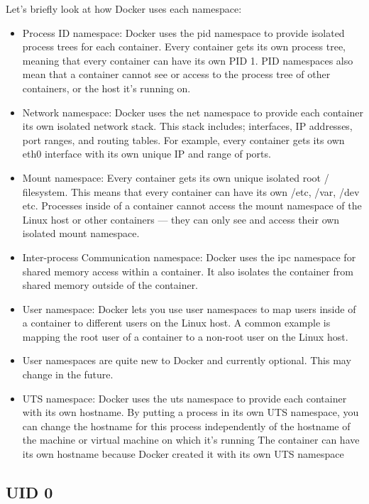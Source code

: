 Let's briefly look at how Docker uses each namespace:
\begin{itemize}
    \item Process ID namespace: Docker uses the pid namespace to provide isolated process trees for each container. Every container gets its own process tree, meaning that every container can have its own PID 1. PID namespaces also mean that a container cannot see or access to the process tree of other containers, or the host it's running on.
    \item Network namespace: Docker uses the net namespace to provide each container its own isolated network stack. This stack includes; interfaces, IP addresses, port ranges, and routing tables. For example, every container gets its own eth0 interface with its own unique IP and range of ports.
    \item Mount namespace: Every container gets its own unique isolated root / filesystem. This means that every container can have its own /etc, /var, /dev etc. Processes inside of a container cannot access the mount namespace of the Linux host or other containers — they can only see and access their own isolated mount namespace.
    \item Inter-process Communication namespace: Docker uses the ipc namespace for shared memory access within a container. It also isolates the container from shared memory outside of the container.
    \item User namespace: Docker lets you use user namespaces to map users inside of a container to different users on the Linux host. A common example is mapping the root user of a container to a non-root user on the Linux host.
    \item User namespaces are quite new to Docker and currently optional. This may change in the future.
    \item UTS namespace: Docker uses the uts namespace to provide each container with its own hostname.  By putting a process in its own UTS namespace, you can change the hostname for this process independently of the hostname of the machine or virtual machine on which it's running The container can have its own hostname because Docker created it with its own UTS namespace
\end{itemize}

\subsection{UID 0}
\label{ssec::security:uid0}

